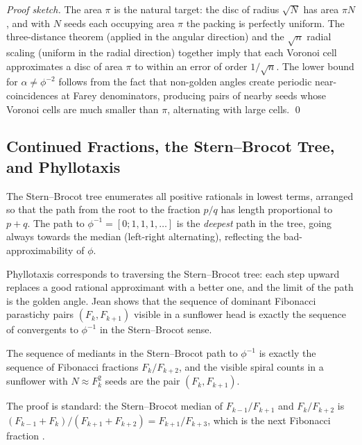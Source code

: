 \begin{proof}[Proof sketch]
The area $\pi$ is the natural target: the disc of radius $\sqrt{N}$
has area $\pi N$, and with $N$ seeds each occupying area $\pi$ the
packing is perfectly uniform.  The three-distance theorem (applied in
the angular direction) and the $\sqrt{n}$ radial scaling (uniform in
the radial direction) together imply that each Voronoi cell approximates
a disc of area $\pi$ to within an error of order $1/\sqrt{n}$.  The
lower bound for $\alpha \neq \phi^{-2}$ follows from the fact that
non-golden angles create periodic near-coincidences at Farey
denominators, producing pairs of nearby seeds whose Voronoi cells are
much smaller than $\pi$, alternating with large cells.
\qed
\end{proof}

\subsection{Continued Fractions, the Stern–Brocot Tree, and Phyllotaxis}
\label{subsec:stern-brocot}

The Stern–Brocot tree enumerates all positive rationals in lowest
terms, arranged so that the path from the root to the fraction $p/q$
has length proportional to $p + q$.  The path to $\phi^{-1} =
[0; 1, 1, 1, \ldots]$ is the \emph{deepest} path in the tree, going
always towards the median (left-right alternating), reflecting the
bad-approximability of $\phi$.

Phyllotaxis corresponds to traversing the Stern–Brocot tree: each step
upward replaces a good rational approximant with a better one, and the
limit of the path is the golden angle.  Jean \cite{jean1994phyllotaxis}
shows that the sequence of dominant Fibonacci parastichy pairs
$(F_k, F_{k+1})$ visible in a sunflower head is exactly the sequence
of convergents to $\phi^{-1}$ in the Stern–Brocot sense.

\begin{proposition}
\label{prop:stern-brocot-fibonacci}
The sequence of mediants in the Stern–Brocot path to $\phi^{-1}$ is
exactly the sequence of Fibonacci fractions $F_k/F_{k+2}$, and the
visible spiral counts in a sunflower with $N \approx F_k^2$ seeds are
the pair $(F_k, F_{k+1})$.
\end{proposition}

The proof is standard: the Stern–Brocot median of $F_{k-1}/F_{k+1}$
and $F_k/F_{k+2}$ is $(F_{k-1}+F_k)/(F_{k+1}+F_{k+2}) = F_{k+1}/F_{k+3}$,
which is the next Fibonacci fraction \cite{mitchison1977phyllotaxis}.

